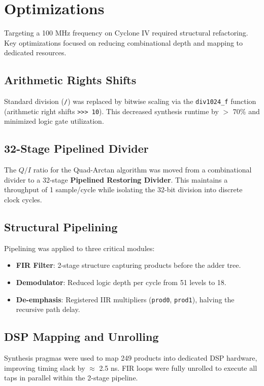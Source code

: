 \section{Optimizations}
Targeting a 100 MHz frequency on Cyclone IV required structural refactoring. Key optimizations focused on reducing combinational depth and mapping to dedicated resources.

\subsection{Arithmetic Rights Shifts}
Standard division (\texttt{/}) was replaced by bitwise scaling via the \texttt{div1024\_f} function (arithmetic right shifts \texttt{>>> 10}). This decreased synthesis runtime by $>$ 70\% and minimized logic gate utilization.

\subsection{32-Stage Pipelined Divider}
The $Q/I$ ratio for the Quad-Arctan algorithm was moved from a combinational divider to a 32-stage \textbf{Pipelined Restoring Divider}. This maintains a throughput of 1 sample/cycle while isolating the 32-bit division into discrete clock cycles.

\subsection{Structural Pipelining}
Pipelining was applied to three critical modules:
\begin{itemize}
    \item \textbf{FIR Filter}: 2-stage structure capturing products before the adder tree.
    \item \textbf{Demodulator}: Reduced logic depth per cycle from 51 levels to 18.
    \item \textbf{De-emphasis}: Registered IIR multipliers (\texttt{prod0}, \texttt{prod1}), halving the recursive path delay.
\end{itemize}

\subsection{DSP Mapping and Unrolling}
Synthesis pragmas were used to map 249 products into dedicated DSP hardware, improving timing slack by $\approx$ 2.5 ns. FIR loops were fully unrolled to execute all taps in parallel within the 2-stage pipeline.

